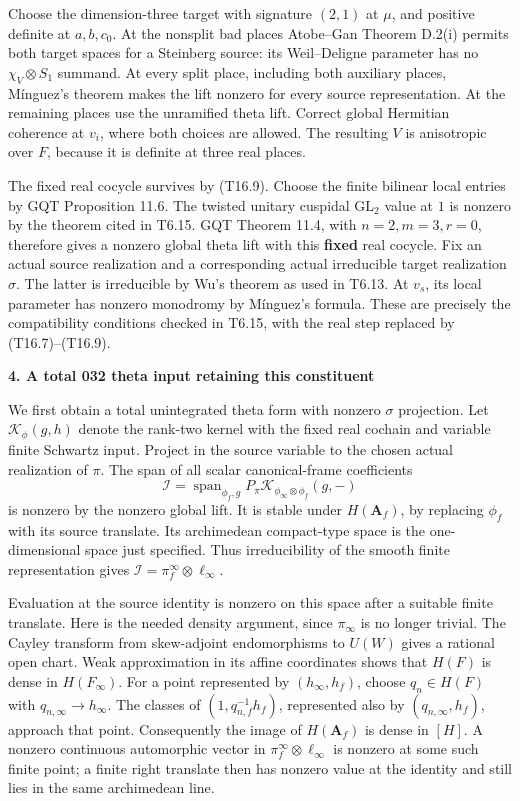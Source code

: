 Choose the dimension-three target with signature \((2,1)\) at \(\mu\), and positive definite at \(a,b,c_0\). At the nonsplit bad places Atobe--Gan Theorem D.2(i) permits both target spaces for a Steinberg source: its Weil--Deligne parameter has no \(\chi_V\otimes S_1\) summand. At every split place, including both auxiliary places, Mínguez's theorem makes the lift nonzero for every source representation. At the remaining places use the unramified theta lift. Correct global Hermitian coherence at \(v_i\), where both choices are allowed. The resulting \(V\) is anisotropic over \(F\), because it is definite at three real places.

The fixed real cocycle survives by (T16.9). Choose the finite bilinear local entries by GQT Proposition 11.6. The twisted unitary cuspidal \(\mathrm{GL}_2\) value at \(1\) is nonzero by the theorem cited in T6.15. GQT Theorem 11.4, with \(n=2,m=3,r=0\), therefore gives a nonzero global theta lift with this \textbf{fixed} real cocycle. Fix an actual source realization and a corresponding actual irreducible target realization \(\sigma\). The latter is irreducible by Wu's theorem as used in T6.13. At \(v_s\), its local parameter has nonzero monodromy by Mínguez's formula. These are precisely the compatibility conditions checked in T6.15, with the real step replaced by (T16.7)--(T16.9).

\textbf{4. A total 032 theta input retaining this constituent}

We first obtain a total unintegrated theta form with nonzero \(\sigma\) projection. Let \(\mathcal K_{\phi}(g,h)\) denote the rank-two kernel with the fixed real cochain and variable finite Schwartz input. Project in the source variable to the chosen actual realization of \(\pi\). The span of all scalar canonical-frame coefficients \[
\mathcal I=\operatorname{span}_{\phi_f,g}
 P_\pi\mathcal K_{\phi_\infty\otimes\phi_f}(g,-)
\tag{T16.10}
\] is nonzero by the nonzero global lift. It is stable under \(H(\mathbf A_f)\), by replacing \(\phi_f\) with its source translate. Its archimedean compact-type space is the one-dimensional space just specified. Thus irreducibility of the smooth finite representation gives \(\mathcal I=\pi_f^\infty\otimes\ell_\infty\).

Evaluation at the source identity is nonzero on this space after a suitable finite translate. Here is the needed density argument, since \(\pi_\infty\) is no longer trivial. The Cayley transform from skew-adjoint endomorphisms to \(U(W)\) gives a rational open chart. Weak approximation in its affine coordinates shows that \(H(F)\) is dense in \(H(F_\infty)\). For a point represented by \((h_\infty,h_f)\), choose \(q_n\in H(F)\) with \(q_{n,\infty}\to h_\infty\). The classes of \((1,q_{n,f}^{-1}h_f)\), represented also by \((q_{n,\infty},h_f)\), approach that point. Consequently the image of \(H(\mathbf A_f)\) is dense in \([H]\). A nonzero continuous automorphic vector in \(\pi_f^\infty\otimes\ell_\infty\) is nonzero at some such finite point; a finite right translate then has nonzero value at the identity and still lies in the same archimedean line.

